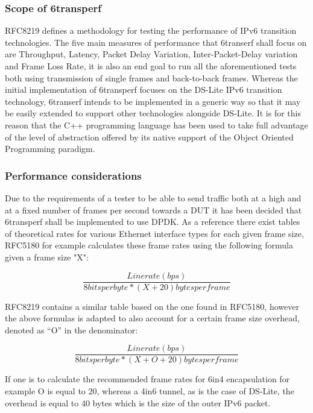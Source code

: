 \documentclass[a4paper,12p]{article}
\begin{document}
\subsubsection{Scope of 6transperf}
RFC8219 defines a methodology for testing the performance of IPv6 transition technologies. The five main measures of performance that 6transerf shall focus on are Throughput, Latency, Packet Delay Variation, Inter-Packet-Delay variation and Frame Loss Rate, it is also an end goal to run all the aforementioned tests both using transmission of single frames and back-to-back frames.
Whereas the initial implementation of 6transperf focuses on the DS-Lite IPv6 transition technology, 6transerf intends to be implemented in a generic way so that it may be easily extended to support other technologies alongside DS-Lite. It is for this reason that the C++ programming language has been used to take full advantage of the level of abstraction offered by its native support of the Object Oriented Programming paradigm.
\subsubsection{Performance considerations}
Due to the requirements of a tester to be able to send traffic both at a high and at a fixed number of frames per second towards a DUT it has been decided that 6transperf shall be implemented to use DPDK. As a reference there exist tables of theoretical rates for various Ethernet interface types for each given frame size, RFC5180 for example calculates these frame rates using the following formula given a frame size "X":

\begin{equation}
\frac{Line rate (bps)}{8 bits per byte*(X+20) bytes per frame}
\end{equation}

RFC8219 contains a similar table based on the one found in RFC5180, however the above formulas is adapted to also account for a certain frame size overhead, denoted as “O” in the denominator:

\begin{equation}
\frac{Line rate (bps)}{8 bits per byte*(X+O+20) bytes per frame}
\end{equation}

If one is to calculate the recommended frame rates for 6in4 encapsulation for example O is equal to 20, whereas a 4in6 tunnel, as is the case of DS-Lite, the overhead is equal to 40 bytes which is the size of the outer IPv6 packet.
\end{document}
